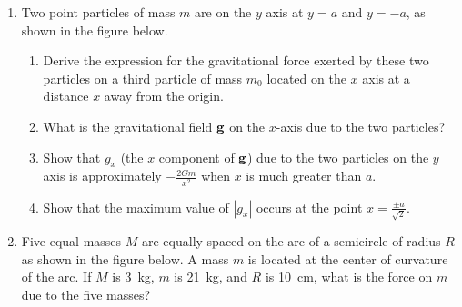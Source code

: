 \documentclass{../../../oss-classkick}
\begin{document}
\begin{enumerate}[leftmargin=15pt]
\item Two point particles of mass $m$ are on the $y$ axis at $y=a$ and $y=-a$,
  as shown in the figure below.
  \begin{center}
  \end{center}
  \begin{enumerate}[nosep]
  \item Derive the expression for the gravitational force exerted by these two
    particles on a third particle of mass $m_0$ located on the $x$ axis at a
    distance $x$ away from the origin.
  \item What is the gravitational field $\mathbf{g}$ on the $x$-axis due to the
    two particles?
  \item Show that $g_x$ (the $x$ component of $\mathbf{g}$) due to the two
    particles on the $y$ axis is approximately $\displaystyle-\frac{2Gm}{x^2}$
    when $x$ is much greater than $a$.
  \item Show that the maximum value of $|g_x|$ occurs at the point
    $\displaystyle x=\frac{\pm a}{\sqrt{2}}$.
  \end{enumerate}
  \newpage

\item Five equal masses $M$ are equally spaced on the arc of a semicircle of
  radius $R$ as shown in the figure below. A mass $m$ is located at the center
  of curvature of the arc. If $M$ is \SI{3}{\kilo\gram}, $m$ is
  \SI{21}{\kilo\gram}, and $R$ is \SI{10}{\centi\metre}, what is the force on
  $m$ due to the five masses?
  \begin{center}
  \end{center}
\end{enumerate}
\end{document}

